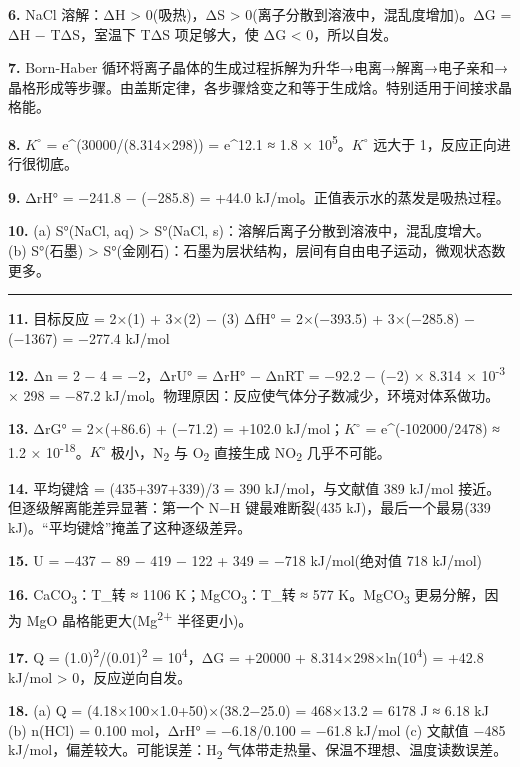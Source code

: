 \textbf{6.} NaCl 溶解：ΔH \textgreater{} 0(吸热)，ΔS \textgreater{} 0(离子分散到溶液中，混乱度增加)。ΔG = ΔH − TΔS，室温下 TΔS 项足够大，使 ΔG \textless{} 0，所以自发。

\textbf{7.} Born-Haber 循环将离子晶体的生成过程拆解为升华→电离→解离→电子亲和→晶格形成等步骤。由盖斯定律，各步骤焓变之和等于生成焓。特别适用于间接求晶格能。

\textbf{8.} \(K^{\circ}\) = e\^{}(30000/(8.314×298)) = e\^{}12.1 ≈ 1.8 × 10\textsuperscript{5}。\(K^{\circ}\) 远大于 1，反应正向进行很彻底。

\textbf{9.} ΔrH° = −241.8 − (−285.8) = +44.0 kJ/mol。正值表示水的蒸发是吸热过程。

\textbf{10.}
(a) S°(NaCl, aq) \textgreater{} S°(NaCl, s)：溶解后离子分散到溶液中，混乱度增大。
(b) S°(石墨) \textgreater{} S°(金刚石)：石墨为层状结构，层间有自由电子运动，微观状态数更多。

\begin{center}\rule{0.5\linewidth}{0.5pt}\end{center}

\textbf{11.} 目标反应 = 2×(1) + 3×(2) − (3)
ΔfH° = 2×(−393.5) + 3×(−285.8) − (−1367) = −277.4 kJ/mol

\textbf{12.} Δn = 2 − 4 = −2，ΔrU° = ΔrH° − ΔnRT = −92.2 − (−2) × 8.314 × 10\textsuperscript{-3} × 298 = −87.2 kJ/mol。物理原因：反应使气体分子数减少，环境对体系做功。

\textbf{13.} ΔrG° = 2×(+86.6) + (−71.2) = +102.0 kJ/mol；\(K^{\circ}\) = e\^{}(-102000/2478) ≈ 1.2 × 10\textsuperscript{-18}。\(K^{\circ}\) 极小，N\textsubscript{2} 与 O\textsubscript{2} 直接生成 NO\textsubscript{2} 几乎不可能。

\textbf{14.} 平均键焓 = (435+397+339)/3 = 390 kJ/mol，与文献值 389 kJ/mol 接近。但逐级解离能差异显著：第一个 N−H 键最难断裂(435 kJ)，最后一个最易(339 kJ)。``平均键焓''掩盖了这种逐级差异。

\textbf{15.} U = −437 − 89 − 419 − 122 + 349 = −718 kJ/mol(绝对值 718 kJ/mol)

\textbf{16.} CaCO\textsubscript{3}：T\_转 ≈ 1106 K；MgCO\textsubscript{3}：T\_转 ≈ 577 K。MgCO\textsubscript{3} 更易分解，因为 MgO 晶格能更大(Mg\textsuperscript{2+} 半径更小)。

\textbf{17.} Q = (1.0)\textsuperscript{2}/(0.01)\textsuperscript{2} = 10\textsuperscript{4}，ΔG = +20000 + 8.314×298×ln(10\textsuperscript{4}) = +42.8 kJ/mol \textgreater{} 0，反应逆向自发。

\textbf{18.}
(a) Q = (4.18×100×1.0+50)×(38.2−25.0) = 468×13.2 = 6178 J ≈ 6.18 kJ
(b) n(HCl) = 0.100 mol，ΔrH° = −6.18/0.100 = −61.8 kJ/mol
(c) 文献值 −485 kJ/mol，偏差较大。可能误差：H\textsubscript{2} 气体带走热量、保温不理想、温度读数误差。

